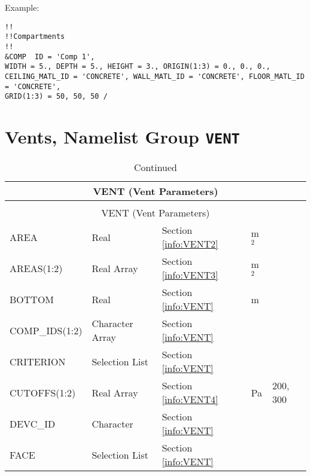 \noindent Example:
\begin{lstlisting}
!!
!!Compartments
!!
&COMP  ID = 'Comp 1',
WIDTH = 5., DEPTH = 5., HEIGHT = 3., ORIGIN(1:3) = 0., 0., 0.,
CEILING_MATL_ID = 'CONCRETE', WALL_MATL_ID = 'CONCRETE', FLOOR_MATL_ID = 'CONCRETE',
GRID(1:3) = 50, 50, 50 /
\end{lstlisting}




\clearpage
\section{Vents, Namelist Group \texorpdfstring{{\tt VENT}}{VENT}}
\begin{longtable}{@{\extracolsep{\fill}}|l|l|l|l|l|}
\caption[Vent Parameters ({\ct VENT} namelist group)]{For more information see Section~\ref{info:VENT}.}
\label{tbl:VENT} \\
\hline
\multicolumn{5}{|c|}{{\ct VENT} (Vent Parameters)} \\
\hline \hline
\endfirsthead
\caption[]{Continued} \\
\hline
\multicolumn{5}{|c|}{{\ct VENT} (Vent Parameters)} \\
\hline \hline
\endhead
{\ct AREA}      	  & Real  	& Section \ref{info:VENT2}                 & m$^2$                       &                 \\ \hline
{\ct AREAS(1:2)}      	  & Real Array 	& Section \ref{info:VENT3}                 & m$^2$                       &                 \\ \hline
{\ct BOTTOM}       	  & Real  	& Section \ref{info:VENT}                 & m                           &                 \\ \hline
{\ct COMP\_IDS(1:2)}     	  & Character Array   & Section \ref{info:VENT}                 &                             &                 \\ \hline
{\ct CRITERION}           & Selection List   & Section \ref{info:VENT}                 &                             &                 \\ \hline
{\ct CUTOFFS(1:2)}         & Real Array 	& Section \ref{info:VENT4}                 & Pa                          &     200, 300     \\ \hline
{\ct DEVC\_ID}            & Character   & Section \ref{info:VENT}                 &                             &                 \\ \hline
{\ct FACE}      	  & Selection List   & Section \ref{info:VENT}                 &                             &                 \\ \hline

\end{longtable}
